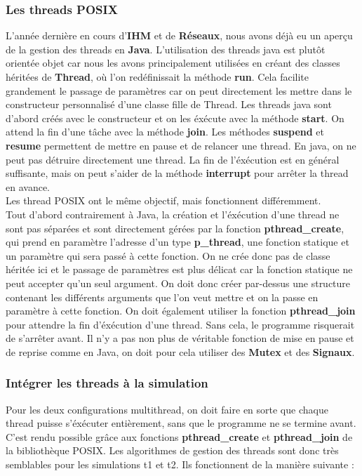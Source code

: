 \documentclass[11pt]{article} %
\begin{document}
\subsubsection{Les threads POSIX}

L'année dernière en cours d'\textbf{IHM} et de \textbf{Réseaux}, nous avons déjà eu un aperçu de la gestion des threads en \textbf{Java}. L'utilisation des threads java est plutôt orientée objet car nous les avons principalement utilisées en créant des classes héritées de \textbf{Thread}, où l'on redéfinissait la méthode \textbf{run}. Cela facilite grandement le passage de paramètres car on peut directement les mettre dans le constructeur personnalisé d'une classe fille de Thread.
Les threads java sont d'abord créés avec le constructeur et on les éxécute avec la méthode \textbf{start}. On attend la fin d'une tâche avec la méthode \textbf{join}. Les méthodes \textbf{suspend} et \textbf{resume} permettent de mettre en pause et de relancer une thread. En java, on ne peut pas détruire directement une thread. La fin de l'éxécution est en général suffisante, mais on peut s'aider de la méthode \textbf{interrupt} pour arrêter la thread en avance. \\

Les thread POSIX ont le même objectif, mais fonctionnent différemment. \\
Tout d'abord contrairement à Java, la création et l'éxécution d'une thread ne sont pas séparées et sont directement gérées par la fonction \textbf{pthread\_create}, qui prend en paramètre l'adresse d'un type \textbf{p\_thread}, une  fonction statique et un paramètre qui sera passé à cette fonction.  On ne crée donc pas de classe héritée ici et le passage de paramètres est plus délicat car la fonction statique ne peut accepter qu'un seul argument. On doit donc créer par-dessus une structure contenant les différents arguments que l'on veut mettre et on la passe en paramètre à cette fonction. On doit également utiliser la fonction \textbf{pthread\_join} pour attendre la fin d'éxécution d'une thread. Sans cela, le programme risquerait de s'arrêter avant. Il n'y a pas non plus de véritable fonction de mise en pause et de reprise comme en Java, on doit pour cela utiliser des \textbf{Mutex} et des \textbf{Signaux}.

\subsubsection{Intégrer les threads à la simulation}
Pour les deux configurations multithread, on doit faire en sorte que chaque thread puisse s'éxécuter entièrement, sans que le programme ne se termine avant. C'est rendu possible grâce aux fonctions \textbf{pthread\_create} et \textbf{pthread\_join} de la bibliothèque POSIX. Les algorithmes de gestion des threads sont donc très semblables pour les simulations t1 et t2. Ils fonctionnent de la manière suivante : 
\end{document}
